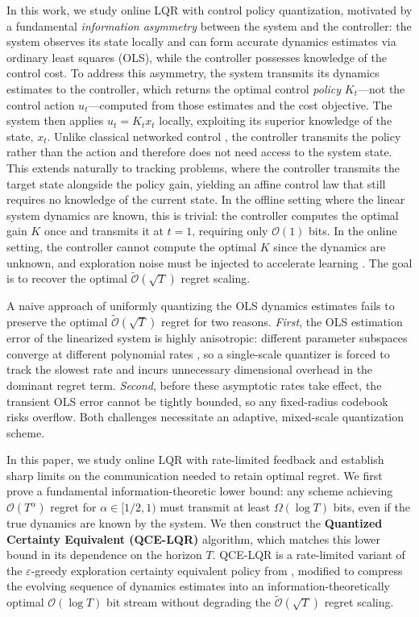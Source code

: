 \documentclass[11pt,journal,onecolumn]{IEEEtran}
\begin{document}
In this work, we study online LQR with control policy quantization, motivated by a fundamental \emph{information asymmetry} between the system and the controller: the system observes its state locally and can form accurate dynamics estimates via ordinary least squares (OLS), while the controller possesses knowledge of the control cost. To address this asymmetry, the system transmits its dynamics estimates to the controller, which returns the optimal control \emph{policy} $K_t$---not the control action $u_t$---computed from those estimates and the cost objective. The system then applies $u_t = K_t x_t$ locally, exploiting its superior knowledge of the state, $x_t$. Unlike classical networked control \cite{sahaimitter, kostina2019}, the controller transmits the policy rather than the action and therefore does not need access to the system state. This extends naturally to tracking problems, where the controller transmits the target state alongside the policy gain, yielding an affine control law that still requires no knowledge of the current state. In the offline setting where the linear system dynamics are known, this is trivial: the controller computes the optimal gain $K$ once and transmits it at $t=1$, requiring only $\mathcal{O}(1)$ bits. In the online setting, the controller cannot compute the optimal $K$ since the dynamics are unknown, and exploration noise must be injected to accelerate learning \cite{mania2019, simchowitz20a}. The goal is to recover the optimal $\tilde{\mathcal{O}}(\sqrt{T})$ regret scaling.

A naive approach of uniformly quantizing the OLS dynamics estimates fails to preserve the optimal $\tilde{\mathcal{O}}(\sqrt{T})$ regret for two reasons. \emph{First}, the OLS estimation error of the linearized system is highly anisotropic: different parameter subspaces converge at different polynomial rates \cite{simchowitz20a}, so a single-scale quantizer is forced to track the slowest rate and incurs unnecessary dimensional overhead in the dominant regret term. \emph{Second}, before these asymptotic rates take effect, the transient OLS error cannot be tightly bounded, so any fixed-radius codebook risks overflow. Both challenges necessitate an adaptive, mixed-scale quantization scheme.

In this paper, we study online LQR with rate-limited feedback and establish sharp limits on the communication needed to retain optimal regret. We first prove a fundamental information-theoretic lower bound: any scheme achieving $\mathcal{O}(T^\alpha)$ regret for $\alpha \in [1/2,1)$ must transmit at least $\Omega(\log T)$ bits, even if the true dynamics are known by the system. We then construct the \textbf{Quantized Certainty Equivalent (QCE-LQR)} algorithm, which matches this lower bound in its dependence on the horizon $T$. QCE-LQR is a rate-limited variant of the $\varepsilon$-greedy exploration certainty equivalent policy from \cite{simchowitz20a}, modified to compress the evolving sequence of dynamics estimates into an information-theoretically optimal $\mathcal{O}(\log T)$ bit stream without degrading the $\tilde{\mathcal{O}}(\sqrt{T})$ regret scaling.
\end{document}
